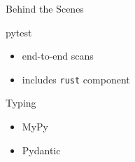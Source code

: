 \documentclass[aspectratio=169]{beamer}
\begin{document}
\begin{frame}{Behind the Scenes}

\begin{minipage}[t]{0.49\textwidth}
\begin{block}{pytest}
  \begin{itemize}
   \item end-to-end scans
   \item includes \texttt{rust} component
  \end{itemize}
 \end{block}
\end{minipage}
\begin{minipage}[t]{0.49\textwidth}
 \begin{block}{Typing}
  \begin{itemize}
   \item MyPy
   \item Pydantic
  \end{itemize}

 \end{block}
\end{minipage}

\end{frame}
\end{document}
